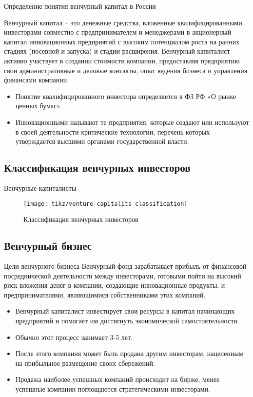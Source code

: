 \documentclass[_Venture_p1.tex]{subfiles}
\begin{document}
\begin{frame}{Определение понятия венчурный капитал в России}
\small
\begin{block}{Венчурный капитал}
	\quad
	– это денежные средства, вложенные квалифицированными инвесторами совместно с предпринимателем и менеджерами в акционерный капитал инновационных предприятий с высоким потенциалом роста на ранних стадиях (посевной и запуска) и стадии расширения. Венчурный капиталист активно участвует в создании стоимости компании, предоставляя предприятию свои административные и деловые контакты, опыт ведения бизнеса и управления финансами компании.	
\end{block}
\end{frame}
\begin{frame}
\begin{itemize}
	\item Понятие квалифицированного инвестора определяется в ФЗ РФ «О рынке ценных бумаг». 
	\item Инновационными называют те предприятия, которые создают или используют в своей деятельности критические технологии, перечень которых утверждается высшими органами государственной власти. 
\end{itemize}
\end{frame}
\subsection{Классификация венчурных инвесторов}
\begin{frame}{Венчурные капиталисты}
	\begin{figure}
		\center
		\texttt{[image: tikz/venture\_capitalits\_classification]}
	\caption{Классификация венчурных инвесторов}
	\end{figure}
\end{frame}

\subsection{Венчурный бизнес}
\begin{frame}[allowframebreaks]{Цели венчурного бизнеса}
Венчурный фонд зарабатывает прибыль от финансовой посреднической деятельности между инвесторами, готовыми пойти на высокий риск вложения денег в компании, создающие инновационные продукты, и предпринимателями, являющимися собственниками этих компаний.

\pagebreak
\begin{itemize}
	\item Венчурный капиталист инвестирует свои ресурсы в капитал начинающих предприятий и помогает им достигнуть экономической самостоятельности. 
	\item Обычно этот процесс занимает 3-5 лет. 
	\item После этого компания может быть продана другим инвесторам, нацеленным на прибыльное размещение своих сбережений. 
	\item Продажа наиболее успешных компаний происходит на бирже, менее успешные компании поглощаются стратегическими инвесторами.
\end{itemize}
\end{frame}
\end{document}
